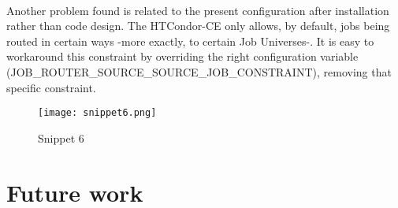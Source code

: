 \documentclass[a4paper]{jpconf}
\begin{document}

~

Another problem found is related to the present configuration after installation rather than code design. 
The HTCondor-CE only allows, by default, jobs being routed in certain ways -more exactly, to certain Job Universes-.
It is easy to workaround this constraint by overriding the right configuration
variable (JOB\_ROUTER\_SOURCE\_SOURCE\_JOB\_CONSTRAINT), removing that specific
constraint.

\begin{figure}[h]
    \centering
    \texttt{[image: snippet6.png]}
    \caption{Snippet 6}
    \label{fig:snippet6}
\end{figure}


\section{Future work}
\end{document}
